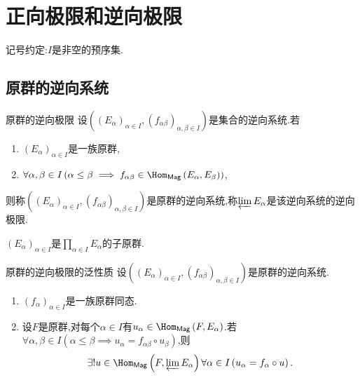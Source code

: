 \chapter{正向极限和逆向极限}

记号约定:$I$是非空的预序集.

\section{原群的逆向系统}

\begin{definition}{原群的逆向极限}{}
	设$\left(\left(E_{\alpha}\right)_{\alpha\in I},\left(f_{\alpha\beta}\right)_{\alpha,\beta\in I}\right)$是集合的逆向系统.若
	\begin{enumerate}
		\item $\left(E_{\alpha}\right)_{\alpha\in I}$是一族原群,
		\item $\forall\alpha,\beta\in I\left(\alpha\leq\beta\implies f_{\alpha\beta}\in\Hom_{\mathsf{Mag}}\left(E_{\alpha},E_{\beta}\right)\right)$,
	\end{enumerate}
	则称$\left(\left(E_{\alpha}\right)_{\alpha\in I},\left(f_{\alpha\beta}\right)_{\alpha,\beta\in I}\right)$是原群的逆向系统,称$\varprojlim E_{\alpha}$是该逆向系统的逆向极限.
\end{definition}

\begin{remark}{}{}
	$\left(E_{\alpha}\right)_{\alpha\in I}$是$\prod\limits_{\alpha\in I}E_{\alpha}$的子原群.
\end{remark}

\begin{proposition}{原群的逆向极限的泛性质}{}
	设$\left(\left(E_{\alpha}\right)_{\alpha\in I},\left(f_{\alpha\beta}\right)_{\alpha,\beta\in I}\right)$是原群的逆向系统.
	\begin{enumerate}
		\item $\left(f_{\alpha}\right)_{\alpha\in I}$是一族原群同态.
		\item 设$F$是原群,对每个$\alpha\in I$有$u_{\alpha}\in\Hom_{\mathsf{Mag}}\left(F,E_{\alpha}\right)$.若$\forall\alpha,\beta\in I\left(\alpha\leq\beta\implies u_{\alpha}=f_{\alpha\beta}\circ u_{\beta}\right)$,则
		\begin{align*}
			\exists!u\in\Hom_{\mathsf{Mag}}\left(F,\varprojlim E_{\alpha}\right)\forall\alpha\in I\left(u_{\alpha}=f_{\alpha}\circ u\right).
		\end{align*}
	\end{enumerate}
\end{proposition}

